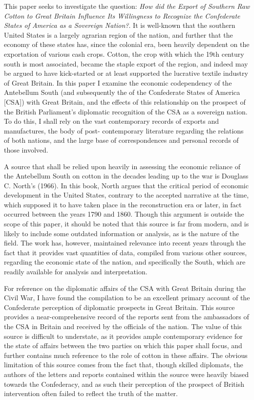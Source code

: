 
This paper seeks to investigate the question: \flq{}\textit{How did the Export of Southern Raw Cotton to Great Britain Influence Its Willingness to Recognize the
Confederate States of America as a Sovereign Nation?}\frq{}. It is well-known that the southern United States is a largely agrarian region of the nation, and further that the 
economy of these states has, since the colonial era, been heavily dependent on the exportation of various \flq{}cash crops\frq{}. Cotton, the crop with which 
the 19th century south is most associated, became the staple export of the region, and indeed may be argued to have kick-started or at least supported the 
lucrative textile industry of Great Britain. In this paper I examine the economic codependency of the Antebellum South (and subsequently the of the 
Confederate States of America [CSA]) with Great Britain, and the effects of this relationship on the prospect of the British Parliament's diplomatic 
recognition of the CSA as a sovereign nation. To do this, I shall rely on the vast contemporary records of exports and manufactures, the body of post-
contemporary literature regarding the relations of both nations, and the large base of correspondences and personal records of those involved.

A source that shall be relied upon heavily in assessing the economic reliance of the Antebellum South on cotton in the decades leading up to the war is 
Douglass C. North's  (1966). In this book, North argues that the critical period of economic development in the United States, 
contrary to the accepted narrative at the time, which supposed it to have taken place in the reconstruction era or later, in fact occurred between the
years 1790 and 1860. Though this argument is outside the scope of this paper, it should be noted that this source is far from modern, and is likely
to include some outdated information or analysis, as is the nature of the field. The work has, however, maintained relevance into recent years
through the fact that it provides vast quantities of data, compiled from various other sources, regarding the economic state of the nation, and specifically
the South, which are readily available for analysis and interpretation.

For reference on the diplomatic affairs of the CSA with Great Britain during the Civil War, I have found the compilation 
to be an excellent primary account of the Confederate perception of diplomatic prospects in Great Britain. This source provides a near-comprehensive 
record of the reports sent from the ambassadors of the CSA in Britain and received by the officials of the nation. The value of this source is difficult
to understate, as it provides ample contemporary evidence for the state of affairs between the two parties on which this paper shall focus, and further
contains much reference to the role of cotton in these affairs. The obvious limitation of this source comes from the fact that, though skilled diplomats,
the authors of the letters and reports contained within the source were heavily biased towards the Confederacy, and as such their perception of the 
prospect of British intervention often failed to reflect the truth of the matter. 